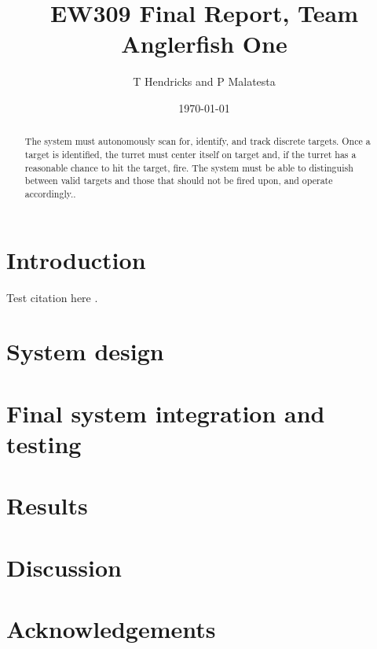 \documentclass{article}
\title{EW309 Final Report, Team Anglerfish One}
\author{T Hendricks and P Malatesta}
\date{\today}
\begin{document}
\maketitle

\begin{abstract}
The system must autonomously scan for, identify, and track discrete targets. Once a target is identified, the turret must center itself on target and, if the turret has a reasonable chance to hit the target, fire. The system must be able to distinguish between valid targets and those that should not be fired upon, and operate accordingly..
\end{abstract}

\section{Introduction}
Test citation here \cite{buck2020go}.



\section{System design}






\section{Final system integration and testing}
\section{Results}
\section{Discussion}
\section{Acknowledgements}



\appendix

\end{document}
